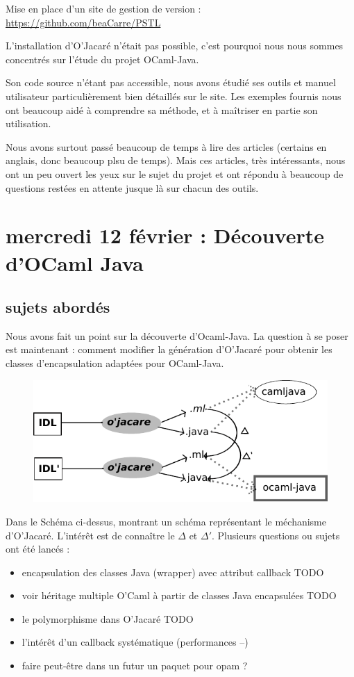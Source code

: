 \documentclass[a4paper, 11pt]{report}
\begin{document}
Mise en place d'un site de gestion de version :
\url{https://github.com/beaCarre/PSTL}
\newline

L'installation d'O'Jacaré n'était pas possible, c'est pourquoi nous
nous sommes concentrés sur l'étude du projet OCaml-Java. 

Son code source n'étant pas accessible, nous avons étudié ses outils
et manuel utilisateur particulièrement bien détaillés sur le site. Les
exemples fournis nous ont beaucoup aidé à comprendre sa méthode, et à
maîtriser en partie son utilisation.

Nous avons surtout passé beaucoup de temps à lire des articles
(certains en anglais, donc beaucoup plsu de temps).
Mais ces articles, très intéressants, nous ont un peu ouvert les yeux sur
le sujet du projet et ont répondu à beaucoup de questions restées en
attente jusque là sur chacun des outils. 






\section{mercredi 12 février : Découverte d'OCaml Java}
\subsection{sujets abordés}
Nous avons fait un point sur la découverte d'Ocaml-Java. La question à
se poser est maintenant : comment modifier la génération d'O'Jacaré
pour obtenir les classes d'encapsulation adaptées pour OCaml-Java.
\begin{figure}[h]
\includegraphics{schema1.pdf}
\end{figure}
Dans le Schéma ci-dessus, montrant un schéma représentant le
méchanisme d'O'Jacaré.
L'intérêt est de connaître le $\Delta$ et
$\Delta'$.
Plusieurs questions ou sujets ont été lancés :
\begin{itemize}
\item encapsulation des classes Java (wrapper) avec attribut callback
  TODO
\item voir héritage multiple O'Caml à partir de classes Java
  encapsulées TODO
\item le polymorphisme dans O'Jacaré TODO
\item l'intérêt d'un callback systématique (performances --)
\item faire peut-être dans un futur un paquet pour opam ?
\end{itemize}
\end{document}
